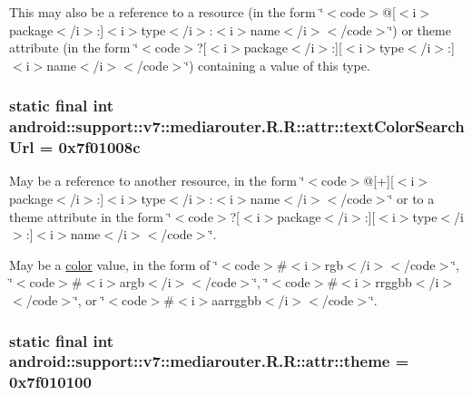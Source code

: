 This may also be a reference to a resource (in the form \char`\"{}$<$code$>$@\mbox{[}$<$i$>$package$<$/i$>$:\mbox{]}$<$i$>$type$<$/i$>$:$<$i$>$name$<$/i$>$$<$/code$>$\char`\"{}) or theme attribute (in the form \char`\"{}$<$code$>$?\mbox{[}$<$i$>$package$<$/i$>$:\mbox{]}\mbox{[}$<$i$>$type$<$/i$>$:\mbox{]}$<$i$>$name$<$/i$>$$<$/code$>$\char`\"{}) containing a value of this type. \hypertarget{classandroid_1_1support_1_1v7_1_1mediarouter_1_1_r_1_1attr_52a5eb97fd1cef46c6a1ff8247c17524}{
\subsubsection[{textColorSearchUrl}]{\setlength{\rightskip}{0pt plus 5cm}static final int android::support::v7::mediarouter.R.R::attr::textColorSearchUrl = 0x7f01008c}}
\label{classandroid_1_1support_1_1v7_1_1mediarouter_1_1_r_1_1attr_52a5eb97fd1cef46c6a1ff8247c17524}


May be a reference to another resource, in the form \char`\"{}$<$code$>$@\mbox{[}+\mbox{]}\mbox{[}$<$i$>$package$<$/i$>$:\mbox{]}$<$i$>$type$<$/i$>$:$<$i$>$name$<$/i$>$$<$/code$>$\char`\"{} or to a theme attribute in the form \char`\"{}$<$code$>$?\mbox{[}$<$i$>$package$<$/i$>$:\mbox{]}\mbox{[}$<$i$>$type$<$/i$>$:\mbox{]}$<$i$>$name$<$/i$>$$<$/code$>$\char`\"{}. 

May be a \hyperlink{classandroid_1_1support_1_1v7_1_1mediarouter_1_1_r_1_1color}{color} value, in the form of \char`\"{}$<$code$>$\#$<$i$>$rgb$<$/i$>$$<$/code$>$\char`\"{}, \char`\"{}$<$code$>$\#$<$i$>$argb$<$/i$>$$<$/code$>$\char`\"{}, \char`\"{}$<$code$>$\#$<$i$>$rrggbb$<$/i$>$$<$/code$>$\char`\"{}, or \char`\"{}$<$code$>$\#$<$i$>$aarrggbb$<$/i$>$$<$/code$>$\char`\"{}. \hypertarget{classandroid_1_1support_1_1v7_1_1mediarouter_1_1_r_1_1attr_37ffb20ae93cb321449beb100899149e}{
\subsubsection[{theme}]{\setlength{\rightskip}{0pt plus 5cm}static final int android::support::v7::mediarouter.R.R::attr::theme = 0x7f010100}}
\label{classandroid_1_1support_1_1v7_1_1mediarouter_1_1_r_1_1attr_37ffb20ae93cb321449beb100899149e}



